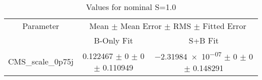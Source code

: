 \begin{table}
\centering
\caption{Values for nominal S=1.0}
\begin{tabular}{ccc}
\toprule
Parameter & \multicolumn{2}{c}{Mean $\pm$ Mean Error $\pm$ RMS $\pm$ Fitted Error}\\
 & B-Only Fit & S+B Fit\\
\midrule
CMS\_scale\_0p75j & \num{0.122467} $\pm$ \num{0} $\pm$ \num{0} $\pm$ \num{0.110949} & \num{-2.31984e-07} $\pm$ \num{0} $\pm$ \num{0} $\pm$ \num{0.148291}\\
\bottomrule
\end{tabular}
\end{table}